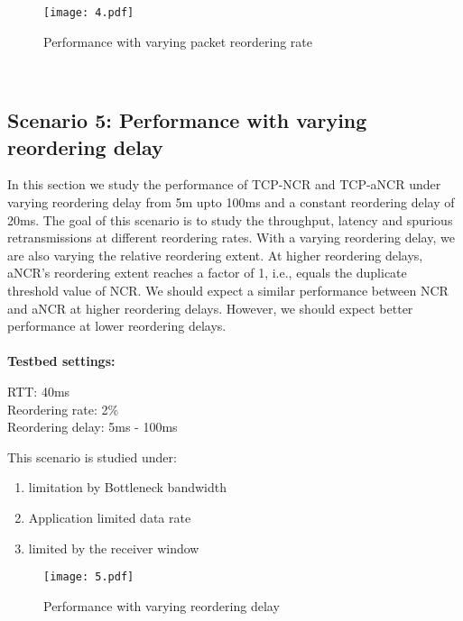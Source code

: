 \begin{figure}
    \centering
    \texttt{[image: 4.pdf]}\\
    \caption{Performance with varying packet reordering rate}\label{fig:4_i}
\end{figure}

\
\subsection{Scenario 5: Performance with varying reordering delay\label{ss:is5}}
In this section we study the performance of TCP-NCR and TCP-aNCR under varying reordering delay from 5m upto 100ms and a constant reordering delay of 20ms. The goal of this scenario is to study the throughput, latency and spurious retransmissions at different reordering rates.
With a varying reordering delay, we are also varying the relative reordering extent. At higher reordering delays, aNCR's reordering extent reaches a factor of 1, i.e., equals the duplicate threshold value of NCR. We should expect a similar performance between NCR and aNCR at higher reordering delays. However, we should expect better performance at lower reordering delays.
\\
\\
\textbf{Testbed settings:}
\begin{tabbing}
\enspace RTT: 40ms \\
\enspace Reordering rate: 2\% \\
\enspace Reordering delay: 5ms - 100ms
\end{tabbing}
This scenario is studied under:
\begin{enumerate}
    \item limitation by Bottleneck bandwidth
    \item Application limited data rate
    \item limited by the receiver window
\end{enumerate}

\begin{figure}
    \centering
    \texttt{[image: 5.pdf]}\\
    \caption{Performance with varying reordering delay}\label{fig:5_i}
\end{figure}

\
